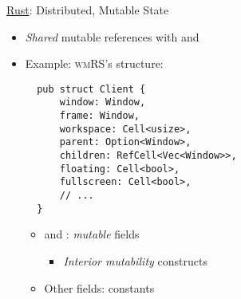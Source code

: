 \begin{frame}[fragile]{\underline{Rust}: Distributed, Mutable State \hfill {\footnotesize \currentname}}


    \begin{itemize}
            
        \item \textit{Shared} mutable references with \underline{} and \underline{}

        \item Example: \textsc{wmRS}'s  structure:\\[3pt]
\begin{verbatim}
  pub struct Client {
      window: Window,
      frame: Window,
      workspace: Cell<usize>,
      parent: Option<Window>,
      children: RefCell<Vec<Window>>,
      floating: Cell<bool>,
      fullscreen: Cell<bool>,
      // ...
  }
\end{verbatim}

    \vspace*{5pt}\begin{itemize}

        \item {} and : \textit{mutable} fields
            \begin{itemize}
                \item \textit{Interior mutability} constructs
            \end{itemize}

        \item Other fields:  constants

    \end{itemize}

    \end{itemize}

    \vfill

\end{frame}

